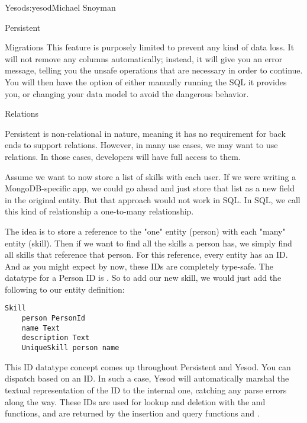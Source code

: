 \begin{aosachapter}{Yesod}{s:yesod}{Michael Snoyman}
\begin{aosasect1}{Persistent}
\begin{aosasect2}{Migrations}
This feature is purposely limited to prevent any kind of data loss. It
will not remove any columns automatically; instead, it will give you
an error message, telling you the unsafe operations that are necessary
in order to continue. You will then have the option of either manually
running the SQL it provides you, or changing your data model to avoid the
dangerous behavior.

\end{aosasect2}

\begin{aosasect2}{Relations}

Persistent is non-relational in nature, meaning it has no requirement
for back ends to support relations. However, in many use cases, we may
want to use relations. In those cases, developers will have full
access to them.

Assume we want to now store a list of skills with each user. If we
were writing a MongoDB-specific app, we could go ahead and just store
that list as a new field in the original  entity. But that
approach would not work in SQL. In SQL, we call this kind of
relationship a one-to-many relationship.

The idea is to store a reference to the "one" entity (person) with
each "many" entity (skill). Then if we want to find all the skills a
person has, we simply find all skills that reference that person. For
this reference, every entity has an ID. And as you might expect by
now, these IDs are completely type-safe. The datatype for a Person ID
is . So to add our new skill, we would just add the
following to our entity definition:

\begin{verbatim}
Skill
    person PersonId
    name Text
    description Text
    UniqueSkill person name
\end{verbatim}

This ID datatype concept comes up throughout Persistent and Yesod. You
can dispatch based on an ID. In such a case, Yesod will automatically
marshal the textual representation of the ID to the internal one,
catching any parse errors along the way. These IDs are used for lookup
and deletion with the  and  functions, and are
returned by the insertion and query functions  and
.

\end{aosasect2}

\end{aosasect1}


\end{aosachapter}
